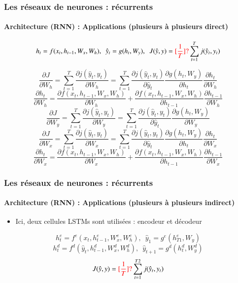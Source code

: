 \documentclass[xcolor=table]{beamer}
\begin{document}
\begin{frame}
	\frametitle{Les réseaux de neurones : récurrents}
	\framesubtitle{Architecture (RNN) : Applications (plusieurs à plusieurs direct)}
	\vspace*{-0.5cm}
	\[ h_t = f(x_t, h_{t-1}, W_x, W_h),\,\,\, \hat{y}_t = g(h_t, W_y),\,\,\,  J(\hat{y}, y) = \textcolor{red}{[\frac{1}{T}]?} \sum_{t=1}^{T} j(\hat{y}_t, y_t)\]
	
	\vspace*{-0.5cm}
	\begin{minipage}{0.7\textwidth}\scriptsize
	\[\frac{\partial J}{\partial W_h} = \sum_{t=1}^{T} \frac{\partial j(\hat{y}_t, y_t)}{\partial W_h}
	= \sum_{t=1}^{T} \frac{\partial j(\hat{y}_t, y_t)}{\partial \hat{y}_t} 
	\frac{\partial g(h_t, W_y)}{\partial h_t} 
	\frac{\partial h_t}{\partial W_h}
	\]
	\[\frac{\partial h_t}{\partial W_h} = 
	\frac{\partial f(x_t, h_{t-1}, W_x, W_h)}{\partial W_h} + 
	\frac{\partial f(x_t, h_{t-1}, W_x, W_h)}{\partial h_{t-1}} \frac{\partial h_{t-1}}{\partial W_h}
	\]
	\[\frac{\partial J}{\partial W_y} 
	= \sum_{t=1}^{T} \frac{\partial j(\hat{y}_t, y_t)}{\partial W_y}
	= \sum_{t=1}^{T} \frac{\partial j(\hat{y}_t, y_t)}{\partial \hat{y}_t} 
	\frac{\partial g(h_t, W_y)}{\partial W_y}
	\]
	\[\frac{\partial J}{\partial W_x} = \sum_{t=1}^{T} \frac{\partial j(\hat{y}_t, y_t)}{\partial W_x}
	= \sum_{t=1}^{T} \frac{\partial j(\hat{y}_t, y_t)}{\partial \hat{y}_t} 
	\frac{\partial g(h_t, W_y)}{\partial h_t} 
	\frac{\partial h_t}{\partial W_x}
	\]
	\[\frac{\partial h_t}{\partial W_x} = 
	\frac{\partial f(x_t, h_{t-1}, W_x, W_h)}{\partial W_x} + 
	\frac{\partial f(x_t, h_{t-1}, W_x, W_h)}{\partial h_{t-1}} \frac{\partial h_{t-1}}{\partial W_x}
	\]
	\end{minipage}
	\begin{minipage}{0.2\textwidth}
	\end{minipage}
	
\end{frame}

\begin{frame}
	\frametitle{Les réseaux de neurones : récurrents}
	\framesubtitle{Architecture (RNN) : Applications (plusieurs à plusieurs indirect)}
	
	\begin{itemize}
		\item Ici, deux cellules LSTMs sont utilisées : encodeur et décodeur
	\end{itemize}

	\[ h^e_t = f^e(x_t, h^e_{t-1}, W^e_x, W^e_h), \,\,\, \hat{y}_1 = g^e(h^e_{T1}, W_y)\]
	\[ h^d_{t} = f^d(\hat{y}_{t}, h^d_{t-1}, W^d_x, W^d_h), \,\,\, \hat{y}_{t+1} = g^d(h^d_{t}, W^d_y)\]
	\[ J(\hat{y}, y) = \textcolor{red}{[\frac{1}{T}]?} \sum_{t=1}^{T2} j(\hat{y}_{t}, y_t)\]
	\begin{center}
	\end{center}
\end{frame}
\end{document}
